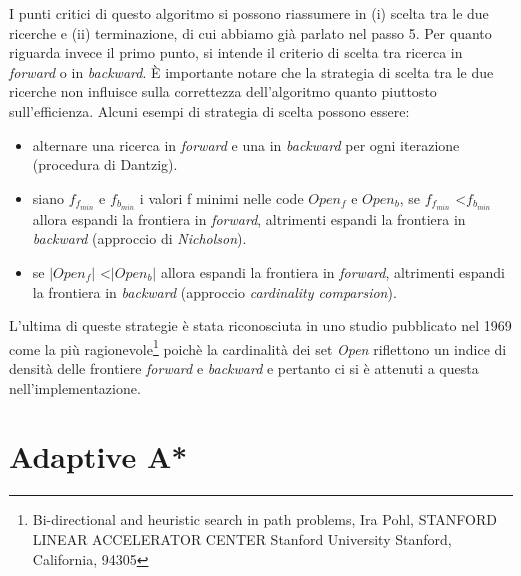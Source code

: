 \documentclass[12pt]{book}
\begin{document}
\par{
I punti critici di questo algoritmo si possono riassumere in (i) scelta tra le due ricerche e (ii) terminazione, di cui abbiamo gi\`a parlato nel passo 5.
Per quanto riguarda invece il primo punto, si intende il criterio di scelta tra ricerca in \emph{forward} o in \emph{backward}. \`E importante notare che la strategia di scelta tra le due ricerche non influisce sulla correttezza dell'algoritmo quanto piuttosto sull'efficienza. Alcuni esempi di strategia di scelta possono essere: \begin{itemize}
\item alternare una ricerca in \emph{forward} e una in \emph{backward} per ogni iterazione (procedura di Dantzig).
\item siano $f_{f_{min}}$ e $f_{b_{min}}$ i valori f minimi nelle code $Open_{f}$ e $Open_{b}$, se $f_{f_{min}}$ \textless $f_{b_{min}}$ allora espandi la frontiera in \emph{forward}, altrimenti espandi la frontiera in \emph{backward} (approccio di \emph{Nicholson}).
\item se $|Open_{f}|$ \textless $|Open_{b}|$ allora espandi la frontiera in \emph{forward}, altrimenti espandi la frontiera in \emph{backward} (approccio \emph{cardinality comparsion}).
\end{itemize}
}
\par{L'ultima di queste strategie \`e stata riconosciuta in uno studio pubblicato nel 1969 come la pi\`u ragionevole\footnote{Bi-directional and heuristic search in path problems, Ira Pohl, STANFORD LINEAR ACCELERATOR CENTER Stanford University Stanford, California, 94305} poich\`e la cardinalit\`a dei set \emph{Open} riflettono un indice di densit\`a delle frontiere \emph{forward} e \emph{backward} e pertanto ci si \`e attenuti a questa nell'implementazione.}


\section{Adaptive A*}
\label{sec:adaptive}
\end{document}

